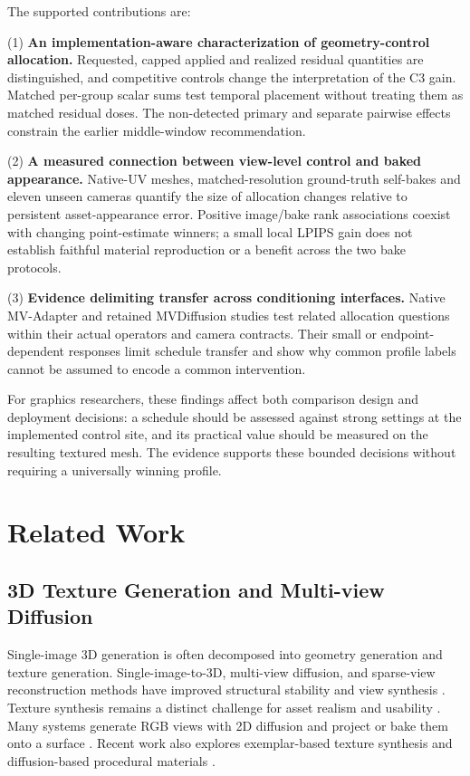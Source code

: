\documentclass[times,twocolumn,final]{elsarticle}
\begin{document}
The supported contributions are:

(1) \textbf{An implementation-aware characterization of geometry-control allocation.} Requested, capped applied and realized residual quantities are distinguished, and competitive controls change the interpretation of the C3 gain. Matched per-group scalar sums test temporal placement without treating them as matched residual doses. The non-detected primary and separate pairwise effects constrain the earlier middle-window recommendation.

(2) \textbf{A measured connection between view-level control and baked appearance.} Native-UV meshes, matched-resolution ground-truth self-bakes and eleven unseen cameras quantify the size of allocation changes relative to persistent asset-appearance error. Positive image/bake rank associations coexist with changing point-estimate winners; a small local LPIPS gain does not establish faithful material reproduction or a benefit across the two bake protocols.

(3) \textbf{Evidence delimiting transfer across conditioning interfaces.} Native MV-Adapter and retained MVDiffusion studies test related allocation questions within their actual operators and camera contracts. Their small or endpoint-dependent responses limit schedule transfer and show why common profile labels cannot be assumed to encode a common intervention.

For graphics researchers, these findings affect both comparison design and deployment decisions: a schedule should be assessed against strong settings at the implemented control site, and its practical value should be measured on the resulting textured mesh. The evidence supports these bounded decisions without requiring a universally winning profile.

\section{Related Work}
\label{sec:related}

\subsection{3D Texture Generation and Multi-view Diffusion}
\label{subsec:3dtex}

Single-image 3D generation is often decomposed into geometry generation and texture generation. Single-image-to-3D, multi-view diffusion, and sparse-view reconstruction methods have improved structural stability and view synthesis \cite{liu2023zero1to3,shi2023zero123pp,liu2023syncdreamer,long2023wonder3d,shi2024mvdream,wang2023imagedream,xu2024instantmesh,ke2024era3d}. Texture synthesis remains a distinct challenge for asset realism and usability \cite{perla2026survey}. Many systems generate RGB views with 2D diffusion and project or bake them onto a surface \cite{chen2023text2tex,richardson2023texture,poole2023dreamfusion,chen2023fantasia3d}. Recent work also explores exemplar-based texture synthesis and diffusion-based procedural materials \cite{guzman2026adaptive,lv2025interpretable}.
\end{document}
